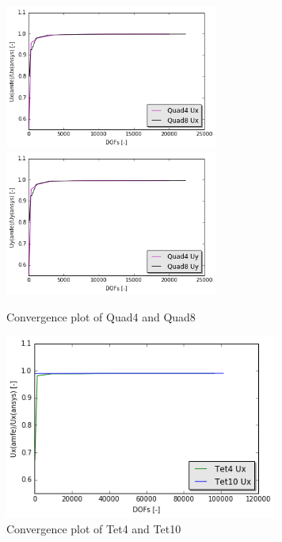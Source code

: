 \begin{figure}[htbp]
	\begin{center}	
		\includegraphics[width=7cm,clip]{QuadConPlotUx.png}
		\includegraphics[width=7cm,clip]{QuadConPlotUy.png} 	 			
		\caption{Convergence plot of Quad4 and Quad8} \label{fig: QuadConPlot}
	\end{center}
\end{figure}

\begin{figure}[htbp]
	\begin{center}	
		\includegraphics[width=9cm,clip]{TetConPlotUx.png}	 			
		\caption{Convergence plot of Tet4 and Tet10} \label{fig: TetConPlot}
	\end{center}
\end{figure}

